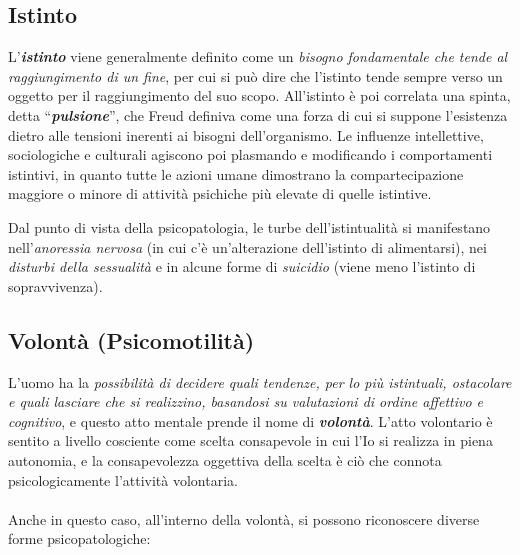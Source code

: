 \subsection{Istinto}

L'\textbf{\emph{istinto}} viene generalmente definito come un
\emph{bisogno fondamentale che tende al raggiungimento di un fine}, per
cui si può dire che l'istinto tende sempre verso un oggetto per il
raggiungimento del suo scopo. All'istinto è poi correlata una spinta,
detta ``\textbf{\emph{pulsione}}'', che Freud definiva come una forza di
cui si suppone l'esistenza dietro alle tensioni inerenti ai bisogni
dell'organismo. Le influenze intellettive, sociologiche e culturali
agiscono poi plasmando e modificando i comportamenti istintivi, in
quanto tutte le azioni umane dimostrano la compartecipazione maggiore o
minore di attività psichiche più elevate di quelle istintive.

Dal punto di vista della psicopatologia, le turbe dell'istintualità si
manifestano nell'\emph{anoressia nervosa} (in cui c'è un'alterazione
dell'istinto di alimentarsi), nei \emph{disturbi della sessualità} e in
alcune forme di \emph{suicidio} (viene meno l'istinto di sopravvivenza).

\subsection{Volontà (Psicomotilità)}

L'uomo ha la \emph{possibilità di decidere quali tendenze, per lo più
istintuali, ostacolare e quali lasciare che si realizzino, basandosi su
valutazioni di ordine affettivo e cognitivo}, e questo atto mentale
prende il nome di \textbf{\emph{volontà}}. L'atto volontario è sentito a
livello cosciente come scelta consapevole in cui l'Io si realizza in
piena autonomia, e la consapevolezza oggettiva della scelta è ciò che
connota psicologicamente l'attività volontaria.
\\\\
Anche in questo caso, all'interno della volontà, si possono riconoscere
diverse forme psicopatologiche:

